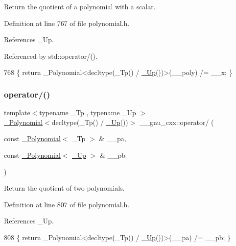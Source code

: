 Return the quotient of a polynomial with a scalar. 

Definition at line 767 of file polynomial.\+h.



References \+\_\+\+Up.



Referenced by std\+::operator/().


\begin{DoxyCode}
768     \{ \textcolor{keywordflow}{return} \_Polynomial<decltype(\_Tp() / \hyperlink{namespace____gnu__cxx_ab693ea357b6429b331e0bf09f9442385}{\_Up}())>(\_\_poly) /= \_\_x; \}
\end{DoxyCode}
\mbox{\label{namespace____gnu__cxx_a6ba146c479b383e9ba26760c847e3dc6}} 
\subsubsection{\texorpdfstring{operator/()}{operator/()}\hspace{0.1cm}{\footnotesize\ttfamily [2/3]}}
{\footnotesize\ttfamily template$<$typename \+\_\+\+Tp , typename \+\_\+\+Up $>$ \\
\hyperlink{class____gnu__cxx_1_1__Polynomial}{\+\_\+\+Polynomial}$<$decltype(\+\_\+\+Tp() / \hyperlink{namespace____gnu__cxx_ab693ea357b6429b331e0bf09f9442385}{\+\_\+\+Up}())$>$ \+\_\+\+\_\+gnu\+\_\+cxx\+::operator/ (\begin{DoxyParamCaption}\item[{const \hyperlink{class____gnu__cxx_1_1__Polynomial}{\+\_\+\+Polynomial}$<$ \+\_\+\+Tp $>$ \&}]{\+\_\+\+\_\+pa,  }\item[{const \hyperlink{class____gnu__cxx_1_1__Polynomial}{\+\_\+\+Polynomial}$<$ \hyperlink{namespace____gnu__cxx_ab693ea357b6429b331e0bf09f9442385}{\+\_\+\+Up} $>$ \&}]{\+\_\+\+\_\+pb }\end{DoxyParamCaption})\hspace{0.3cm}{\ttfamily [inline]}}

Return the quotient of two polynomials. 

Definition at line 807 of file polynomial.\+h.



References \+\_\+\+Up.


\begin{DoxyCode}
808     \{ \textcolor{keywordflow}{return} \_Polynomial<decltype(\_Tp() / \hyperlink{namespace____gnu__cxx_ab693ea357b6429b331e0bf09f9442385}{\_Up}())>(\_\_pa) /= \_\_pb; \}
\end{DoxyCode}
\mbox{\label{namespace____gnu__cxx_a4c1b4c46ffc6c41fb5b5d1a4293ca563}} 
